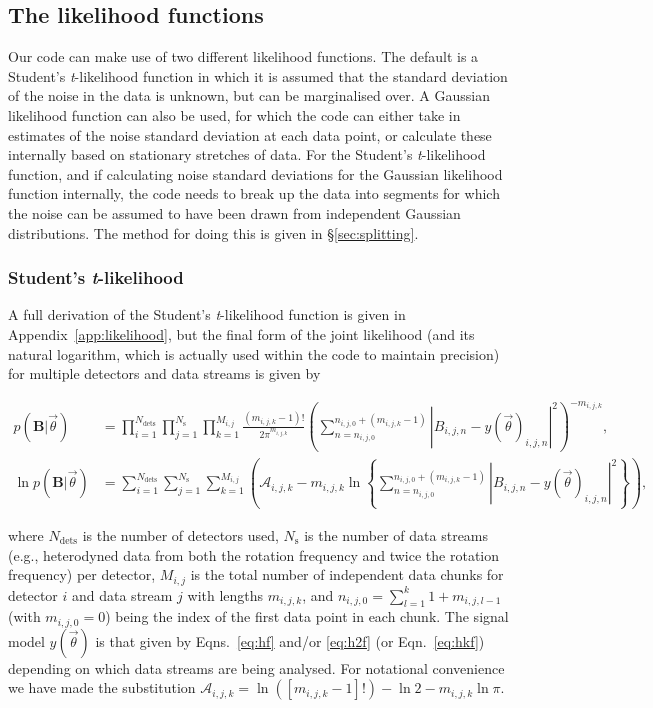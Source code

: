 \subsection{The likelihood functions}\label{sec:likelihood}

Our code can make use of two different likelihood functions. The default is a
Student's {\it t}-likelihood function in which it is assumed that the standard deviation of the noise in the
data is unknown, but can be marginalised over. A Gaussian likelihood function can also be used, for
which the code can either take in estimates of the noise standard deviation at each data point, or calculate
these internally based on stationary stretches of data. For the Student's {\it t}-likelihood function, and if
calculating noise standard deviations for the Gaussian likelihood function internally, the code needs to break
up the data into segments for which the noise can be assumed to have been drawn from independent Gaussian distributions.
The method for doing this is given in \S\ref{sec:splitting}.

\subsubsection{Student's {\it t}-likelihood}\label{sec:stlikelihood}

A full derivation of the Student's {\it t}-likelihood function \citep[see, e.g.,][]{2005PhRvD..72j2002D} is given
in Appendix~\ref{app:likelihood}, but the final form of the joint likelihood (and its natural logarithm,
which is actually used within the code to maintain precision) for multiple detectors and data streams is
given by
\begin{widetext}
\begin{align}\label{eq:stlikelihood}
p(\mathbf{B}|\vec{\theta}) &= \prod_{i=1}^{N_{\text{dets}}} \prod_{j=1}^{N_{\text{s}}} \prod_{k=1}^{M_{i,j}}
\frac{(m_{i,j,k}-1)!}{2\pi^{m_{i,j,k}}}
\left(\sum_{n=n_{i,j,0}}^{n_{i,j,0}+(m_{i,j,k}-1)} |B_{i,j,n}-y(\vec{\theta})_{i,j,n}|^2\right)^{-m_{i,j,k}},
\nonumber \\
\ln{p(\mathbf{B}|\vec{\theta})} &= \sum_{i=1}^{N_{\text{dets}}} \sum_{j=1}^{N_{\text{s}}}
\sum_{k=1}^{M_{i,j}} \left( \mathcal{A}_{i,j,k} - m_{i,j,k}\ln{
\left\{\sum_{n=n_{i,j,0}}^{n_{i,j,0}+(m_{i,j,k}-1)} |B_{i,j,n}-y(\vec{\theta})_{i,j,n}|^2\right\}}
\right),
\end{align}
\end{widetext}
where $N_{\text{dets}}$ is the number of detectors used, $N_{\text{s}}$ is the number of data streams (e.g.,
heterodyned data from both the rotation frequency and twice the rotation frequency) per detector, $M_{i,j}$ is
the total number of independent data chunks for detector $i$ and data stream $j$ with lengths $m_{i,j,k}$, and
$n_{i,j,0} = \sum_{l=1}^{k} 1+m_{i,j,l-1}$ (with $m_{i,j,0} = 0$) being the index of the first data point in
each chunk. The signal model $y(\vec{\theta})$ is that given by Eqns.~\ref{eq:hf} and/or \ref{eq:h2f} (or Eqn.~\ref{eq:hkf})
depending on which data streams are being analysed. For notational convenience we have made the substitution
$\mathcal{A}_{i,j,k} = \ln{\left([m_{i,j,k}-1]!\right)} - \ln{2} - m_{i,j,k}\ln{\pi}$.


